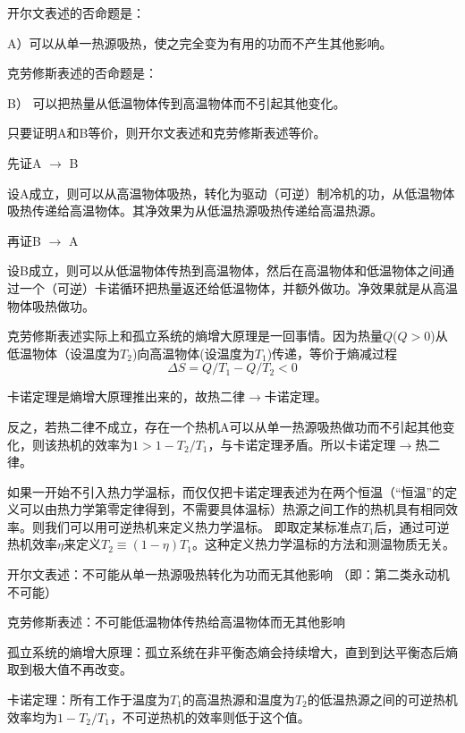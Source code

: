 \documentclass[CJK]{beamer}
\begin{document}
\begin{frame}
\bch
{\small
\bitem
\item{
开尔文表述的否命题是：

A）可以从单一热源吸热，使之完全变为有用的功而不产生其他影响。
}
\item{
克劳修斯表述的否命题是：

B） 可以把热量从低温物体传到高温物体而不引起其他变化。
}
\eitem

只要证明A和B等价，则开尔文表述和克劳修斯表述等价。

先证A $\rightarrow$ B

设A成立，则可以从高温物体吸热，转化为驱动（可逆）制冷机的功，从低温物体吸热传递给高温物体。其净效果为从低温热源吸热传递给高温热源。

\skipline

再证B $\rightarrow$ A

设B成立，则可以从低温物体传热到高温物体，然后在高温物体和低温物体之间通过一个（可逆）卡诺循环把热量返还给低温物体，并额外做功。净效果就是从高温物体吸热做功。
}
\ech
\end{frame}

\begin{frame}
\bchL
克劳修斯表述实际上和孤立系统的熵增大原理是一回事情。因为热量$Q$($Q>0$)从低温物体（设温度为$T_2$)向高温物体(设温度为$T_1$)传递，等价于熵减过程
$$\Delta S = Q/T_1 - Q/T_2<0$$
\echL
\end{frame}

\begin{frame}
\bchL
卡诺定理是熵增大原理推出来的，故热二律$\rightarrow$卡诺定理。

反之，若热二律不成立，存在一个热机A可以从单一热源吸热做功而不引起其他变化，则该热机的效率为$1>1-T_2/T_1$，与卡诺定理矛盾。所以卡诺定理$\rightarrow$热二律。

\echL
\end{frame}

\begin{frame}
\bchL
如果一开始不引入热力学温标，而仅仅把卡诺定理表述为在两个恒温（“恒温”的定义可以由热力学第零定律得到，不需要具体温标）热源之间工作的热机具有相同效率。则我们可以用可逆热机来定义热力学温标。
即取定某标准点$T_1$后，通过可逆热机效率$\eta$来定义$T_2 \equiv (1-\eta)T_1$。这种定义热力学温标的方法和测温物质无关。
\echL
\end{frame}

\begin{frame}
\bchL
\bitem
\item{开尔文表述：不可能从单一热源吸热转化为功而无其他影响 （即：第二类永动机不可能）}
\item{克劳修斯表述：不可能低温物体传热给高温物体而无其他影响}
\item{孤立系统的熵增大原理：孤立系统在非平衡态熵会持续增大，直到到达平衡态后熵取到极大值不再改变。}
\item{卡诺定理：所有工作于温度为$T_1$的高温热源和温度为$T_2$的低温热源之间的可逆热机效率均为$1-T_2/T_1$，不可逆热机的效率则低于这个值。}
\eitem
\echL
\end{frame}
\end{document}
